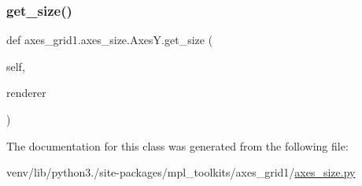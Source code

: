 \subsubsection{\texorpdfstring{get\+\_\+size()}{get\_size()}}
{\footnotesize\ttfamily def axes\+\_\+grid1.\+axes\+\_\+size.\+Axes\+Y.\+get\+\_\+size (\begin{DoxyParamCaption}\item[{}]{self,  }\item[{}]{renderer }\end{DoxyParamCaption})}



The documentation for this class was generated from the following file\+:\begin{DoxyCompactItemize}
\item 
venv/lib/python3./site-\/packages/mpl\+\_\+toolkits/axes\+\_\+grid1/\hyperlink{_2axes__size_8py}{axes\+\_\+size.\+py}\end{DoxyCompactItemize}
